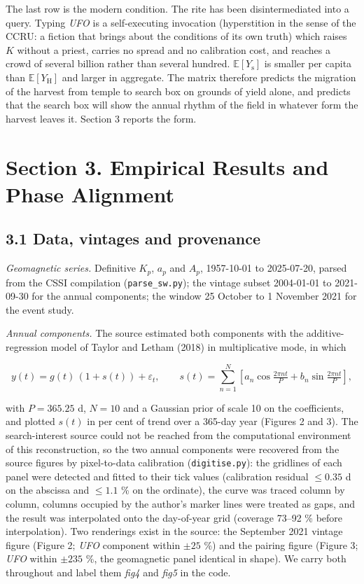 \documentclass[
  10pt,
  a4paper,
]{article}
\begin{document}
The last row is the modern condition. The rite has been disintermediated
into a query. Typing \emph{UFO} is a self-executing invocation
(hyperstition in the sense of the CCRU: a fiction that brings about the
conditions of its own truth) which raises \(K\) without a priest,
carries no spread and no calibration cost, and reaches a crowd of
several billion rather than several hundred.
\(\mathbb E[Y_{\mathrm s}]\) is smaller per capita than
\(\mathbb E[Y_{\mathrm H}]\) and larger in aggregate. The matrix
therefore predicts the migration of the harvest from temple to search
box on grounds of yield alone, and predicts that the search box will
show the annual rhythm of the field in whatever form the harvest leaves
it. Section 3 reports the form.

\hypertarget{section-3.-empirical-results-and-phase-alignment}{%
\section{Section 3. Empirical Results and Phase
Alignment}\label{section-3.-empirical-results-and-phase-alignment}}

\hypertarget{data-vintages-and-provenance}{%
\subsection{3.1 Data, vintages and
provenance}\label{data-vintages-and-provenance}}

\emph{Geomagnetic series.} Definitive \(K_p\), \(a_p\) and \(A_p\),
1957-10-01 to 2025-07-20, parsed from the CSSI compilation
(\texttt{parse\_sw.py}); the vintage subset 2004-01-01 to 2021-09-30 for
the annual components; the window 25 October to 1 November 2021 for the
event study.

\emph{Annual components.} The source estimated both components with the
additive-regression model of Taylor and Letham (2018) in multiplicative
mode, in which

\[y(t) = g(t)\,\left(1 + s(t)\right) + \varepsilon_t, \qquad s(t) = \sum_{n=1}^{N}\left[a_n\cos\tfrac{2\pi n t}{P} + b_n\sin\tfrac{2\pi n t}{P}\right],\]

with \(P = 365.25\) d, \(N = 10\) and a Gaussian prior of scale 10 on
the coefficients, and plotted \(s(t)\) in per cent of trend over a
365-day year (Figures 2 and 3). The search-interest source could not be
reached from the computational environment of this reconstruction, so
the two annual components were recovered from the source figures by
pixel-to-data calibration (\texttt{digitise.py}): the gridlines of each
panel were detected and fitted to their tick values (calibration
residual \(\le 0.35\) d on the abscissa and \(\le 1.1\) \% on the
ordinate), the curve was traced column by column, columns occupied by
the author's marker lines were treated as gaps, and the result was
interpolated onto the day-of-year grid (coverage 73--92 \% before
interpolation). Two renderings exist in the source: the September 2021
vintage figure (Figure 2; \emph{UFO} component within \(\pm 25\) \%) and
the pairing figure (Figure 3; \emph{UFO} within \(\pm 235\) \%, the
geomagnetic panel identical in shape). We carry both throughout and
label them \emph{fig4} and \emph{fig5} in the code.
\end{document}
